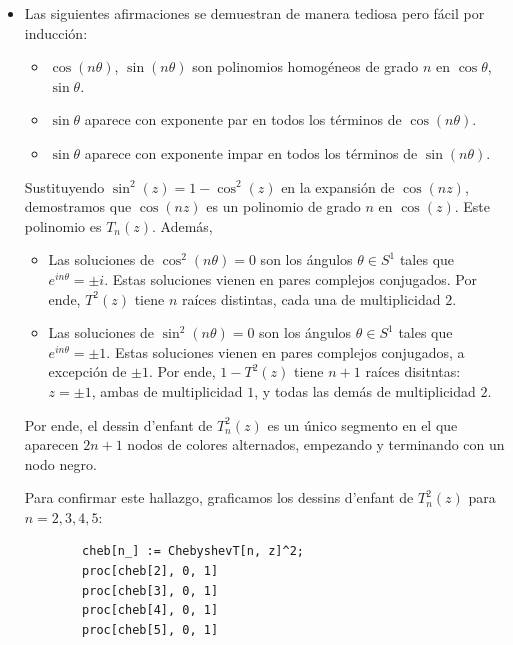 \begin{solution}
\begin{itemize}
\begin{itemize}
        \item Las siguientes afirmaciones se demuestran de manera tediosa pero fácil por inducción:
        \begin{itemize}
            \item $\cos(n \theta)$, $\sin(n \theta)$ son polinomios homogéneos de grado $n$ en $\cos \theta$, $\sin \theta$.
            \item $\sin \theta$ aparece con exponente par en todos los términos de $\cos(n \theta)$.
            \item $\sin \theta$ aparece con exponente impar en todos los términos de $\sin(n \theta)$.
        \end{itemize}
        
        Sustituyendo $\sin^2(z) = 1 - \cos^2(z)$ en la expansión de $\cos(nz)$, demostramos que $\cos(nz)$ es un polinomio de grado $n$ en $\cos(z)$. Este polinomio es $T_n(z)$. Además,
        \begin{itemize}
            \item Las soluciones de $\cos^2(n \theta) = 0$ son los ángulos $\theta \in S^1$ tales que $e^{in\theta} = \pm i$. Estas soluciones vienen en pares complejos conjugados. Por ende, $T^2(z)$ tiene $n$ raíces distintas, cada una de multiplicidad $2$.
            
            \item Las soluciones de $\sin^2(n \theta) = 0$ son los ángulos $\theta \in S^1$ tales que $e^{in\theta} = \pm 1$. Estas soluciones vienen en pares complejos conjugados, a excepción de $\pm 1$. Por ende, $1 - T^2(z)$ tiene $n+1$ raíces disitntas: $z = \pm 1$, ambas de multiplicidad $1$, y todas las demás de multiplicidad $2$.
        \end{itemize}
        
        Por ende, el dessin d'enfant de $T_n^2(z)$ es un único segmento en el que aparecen $2n+1$ nodos de colores alternados, empezando y terminando con un nodo negro.
        
        Para confirmar este hallazgo, graficamos los dessins d'enfant de $T_n^2(z)$ para $n = 2,3,4,5$:
        \begin{lstlisting}
        cheb[n_] := ChebyshevT[n, z]^2;
        proc[cheb[2], 0, 1]
        proc[cheb[3], 0, 1]
        proc[cheb[4], 0, 1]
        proc[cheb[5], 0, 1]
        \end{lstlisting}
        

\end{itemize}
\end{itemize}
\end{solution}

